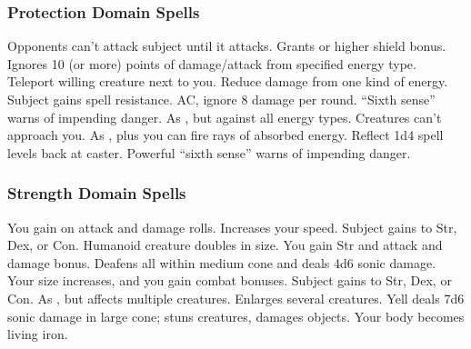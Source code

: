 \subsubsection{Protection Domain Spells}

\begin{spelllist}
   Opponents can't attack subject until it attacks.
   Grants  or higher shield bonus.
   Ignores 10 (or more) points of damage/attack from specified energy type.
   Teleport willing creature next to you.
   Reduce damage from one kind of energy.
  \spellhead[3]{}
   Subject gains spell resistance.
    AC, ignore 8 damage per round.
  \spellhead[5]{}
   ``Sixth sense'' warns of impending danger.
   As , but against all energy types.
   Creatures can't approach you.
   As , plus you can fire rays of absorbed energy.
   Reflect 1d4 spell levels back at caster.
  \spellhead[8]{}
  \spellhead[8]{}
   Powerful ``sixth sense'' warns of impending danger.
  \spellhead[9]{}
\end{spelllist}

\subsubsection{Strength Domain Spells}

\begin{spelllist}
   You gain  on attack and damage rolls.
   Increases your speed.
   Subject gains  to Str, Dex, or Con.
  \spellhead[2]{}
   Humanoid creature doubles in size.
  \spellhead[3]{}
   You gain  Str and attack and damage bonus.
   Deafens all within medium cone and deals 4d6 sonic damage.
   Your size increases, and you gain combat bonuses.
   Subject gains  to Str, Dex, or Con.
   As , but affects multiple creatures.
  \spellhead[6]{}
   Enlarges several creatures.
   Yell deals 7d6 sonic damage in large cone; stuns creatures, damages objects.
   Your body becomes living iron.
  \spellhead[8]{}
  \spellhead[9]{}
  \spellhead[9]{} 
\end{spelllist}


